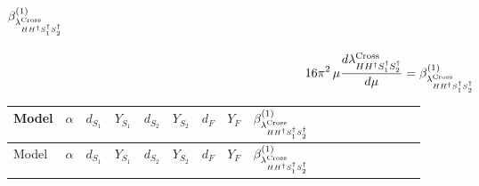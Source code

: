 \documentclass{article}
\begin{document}
\begin{landscape}
\section*{$\beta_{\lambda_{H H^\dagger S_1^\dagger S_2^\dagger}^{\rm Cross}}^{(1)}$}
\[16\pi^2\,\mu\frac{d \lambda_{H H^\dagger S_1^\dagger S_2^\dagger}^{\rm Cross}}{d\mu}=\beta_{\lambda_{H H^\dagger S_1^\dagger S_2^\dagger}^{\rm Cross}}^{(1)}\]
\tiny
\begin{longtable}{@{}llcccccc >{\raggedright\arraybackslash}p{0.54\linewidth}@{}}
\toprule
Model & $\alpha$ & $d_{S_1}$ & $Y_{S_1}$ & $d_{S_2}$ & $Y_{S_2}$ & $d_F$ & $Y_F$ & $\beta_{\lambda_{H H^\dagger S_1^\dagger S_2^\dagger}^{\rm Cross}}^{(1)}$ \\
\midrule
\endfirsthead
\toprule
Model & $\alpha$ & $d_{S_1}$ & $Y_{S_1}$ & $d_{S_2}$ & $Y_{S_2}$ & $d_F$ & $Y_F$ & $\beta_{\lambda_{H H^\dagger S_1^\dagger S_2^\dagger}^{\rm Cross}}^{(1)}$ \\
\midrule
\endhead

\end{longtable}
\end{landscape}
\end{document}
